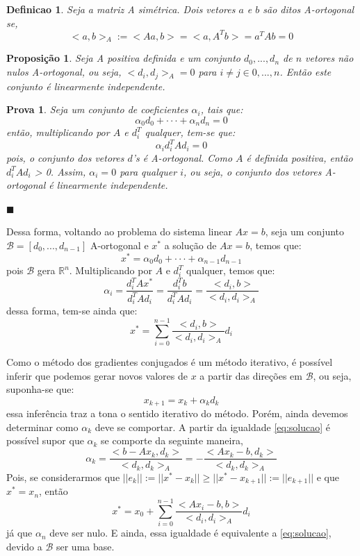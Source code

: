 \documentclass [a4paper,10pt]{article}
\newtheorem{de}{Definicao}
\newtheorem{pa}{Prova}
\newtheorem{pr}{Proposição}
\begin{document}
{    \begin{de}
        Seja a matriz A simétrica. Dois vetores $a$ e $b$ são ditos A-ortogonal se,
            $$
                <a, b>_A := <Aa, b> = <a, A^Tb> = a^TAb = 0
            $$
    \end{de}

    \begin{pr}
        Seja A positiva definida e um conjunto ${d_0, ..., d_n}$ de $n$ vetores não nulos A-ortogonal, ou seja,
        $<d_i, d_j>_A = 0$ para $i \neq j \in {0, ..., n}$.  Então este conjunto é linearmente independente.
    \end{pr}
    \begin{pa}
        Seja um conjunto de coeficientes $\alpha_i$, tais que:
        $$
            \alpha_0d_0 + \cdot\cdot\cdot + \alpha_nd_n = 0
        $$
        então, multiplicando por $A$ e $d_i^T$ qualquer, tem-se que:
        $$
            \alpha_id_i^TAd_i = 0
        $$
        pois, o conjunto dos vetores $d$'s é A-ortogonal. Como $A$ é definida positiva, então $d_i^TAd_i$ > 0.
        Assim, $\alpha_i = 0$ para qualquer $i$, ou seja, o conjunto dos vetores A-ortogonal é linearmente independente.

        \hfill$\blacksquare$
    \end{pa}

    Dessa forma, voltando ao problema do sistema linear $Ax = b$, seja um conjunto $\mathcal{B} = [d_0, ..., d_{n -1}]$
    A-ortogonal e $x^*$ a solução de $Ax = b$, temos que:
    $$
    x^* = \alpha_0d_0 + \cdot\cdot\cdot + \alpha_{n - 1}d_{n - 1}
    $$
    pois $\mathcal{B}$ gera $\mathbb{R}^n$. Multiplicando por $A$ e $d_i^T$ qualquer, temos que:
    $$
    \alpha_i = \frac{d_i^TAx^*}{d_i^TAd_i} = \frac{d_i^Tb}{d_i^TAd_i} = \frac{<d_i, b>}{<d_i, d_i>_A}
    $$
    dessa forma, tem-se ainda que:
    \begin{equation}\label{eq:solucao}
        x^* = \sum_{i = 0}^{n - 1}\frac{<d_i, b>}{<d_i, d_i>_A}d_i
    \end{equation}

    Como o método dos gradientes conjugados é um método iterativo, é possível inferir que podemos gerar novos valores
    de $x$ a partir das direções em $\mathcal{B}$, ou seja, suponha-se que:
    $$
    x_{k+1} = x_k + \alpha_k d_k
    $$
    essa inferência traz a tona o sentido iterativo do método. Porém, ainda devemos determinar como $\alpha_k$ deve se comportar.
    A partir da igualdade \eqref{eq:solucao} é possível supor que $\alpha_k$ se comporte da seguinte maneira,
    $$
    \alpha_k = \frac{<b - Ax_k, d_k>}{<d_k, d_k>_A} = -\frac{<Ax_k - b, d_k>}{<d_k, d_k>_A}
    $$
    Pois, se considerarmos que $||e_k|| := ||x^* - x_k|| \geq ||x^* - x_{k + 1}|| := ||e_{k + 1}||$ e que $x^* = x_n$, então
    $$
    x^* = x_0 + \sum_{i = 0}^{n - 1}\frac{<Ax_i - b, b>}{<d_i, d_i>_A}d_i
    $$
    já que $\alpha_n$ deve ser nulo. E ainda, essa igualdade é equivalente a \eqref{eq:solucao}, devido a $\mathcal{B}$
    ser uma base.

}
\end{document}
